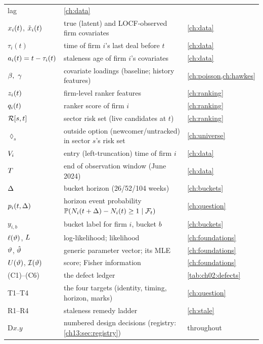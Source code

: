\begin{longtable}{p{} p{} p{}}
lag & \cref{ch:data} \\
$x_i(t)$, $\tilde{x}_i(t)$ & true (latent) and LOCF-observed firm
covariates & \cref{ch:data} \\
$\tau_i(t)$ & time of firm $i$'s last deal before $t$ & \cref{ch:data} \\
$a_i(t) = t - \tau_i(t)$ & staleness age of firm $i$'s
covariates & \cref{ch:data} \\
$\bcoef,\ \gamma$ & covariate loadings (baseline; history features) &
\cref{ch:poisson,ch:hawkes} \\
$z_i(t)$ & firm-level ranker features & \cref{ch:ranking} \\
$q_i(t)$ & ranker score of firm $i$ & \cref{ch:ranking} \\
$\mathcal{R}[s,t]$ & sector risk set (live candidates at $t$) &
\cref{ch:ranking} \\
$\lozenge_s$ & outside option (newcomer/untracked) in sector $s$'s risk
set & \cref{ch:universe} \\
$V_i$ & entry (left-truncation) time of firm $i$ &
\cref{ch:data} \\
$T$ & end of observation window (June 2024) & \cref{ch:data} \\
$\Delta$ & bucket horizon (26/52/104 weeks) & \cref{ch:buckets} \\
$p_i(t,\Delta)$ & horizon event probability
$\mathbb{P}(N_i(t+\Delta)-N_i(t)\ge 1 \mid \mathcal{F}_{t})$ & \cref{ch:question} \\
$y_{i,b}$ & bucket label for firm $i$, bucket $b$ & \cref{ch:buckets} \\
$\ell(\vartheta)$, $L$ & log-likelihood; likelihood &
\cref{ch:foundations} \\
$\vartheta$, $\hat{\vartheta}$ & generic parameter vector; its MLE &
\cref{ch:foundations} \\
$U(\vartheta)$, $\mathcal{I}(\vartheta)$ & score; Fisher
information & \cref{ch:foundations} \\
(C1)--(C6) & the defect ledger & \cref{tab:ch02:defects} \\
T1--T4 & the four targets (identity, timing, horizon, marks) &
\cref{ch:question} \\
R1--R4 & staleness remedy ladder & \cref{ch:stale} \\
D$x$.$y$ & numbered design decisions (registry:
\cref{ch13:sec:registry}) & throughout \\
\bottomrule
\end{longtable}
